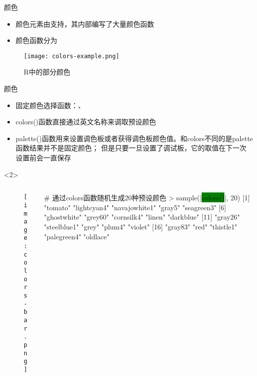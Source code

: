 \begin{frame}[t]{\subsecname}{颜色}
\begin{itemize}
\item<1-> 颜色元素由支持，其内部编写了大量颜色函数
\item<2-> 颜色函数分为
\end{itemize}

\begin{figure}
  \centering
  \texttt{[image: colors-example.png]}
  \caption{R中的部分颜色} 
\end{figure}  
\end{frame}

\begin{frame}[t,fragile]{\subsecname}{颜色}
\begin{itemize}
\item<1-> 固定颜色选择函数：、
\item<2-> colors()函数直接通过英文名称来调取预设颜色
\item<3-> palette()函数用来设置调色板或者获得调色板颜色值。和colors不同的是palette函数结果并不是固定颜色；
但是只要一旦设置了调试板，它的取值在下一次设置前会一直保存
\end{itemize}

\begin{overlayarea}{\textwidth}{\textheight}
\begin{onlyenv}<2>
  \begin{columns}
    \begin{column}{.4\textwidth}
\centering
      \begin{figure}
        \texttt{[image: colors-bar.png]} 
      \end{figure}
    \end{column}

    \begin{column}{.6\textwidth}
\centering
\begin{rcode}
# 通过colors函数随机生成20种预设颜色
> sample(|\colorbox{green}{colors()}|, 20)
 [1] "tomato"       "lightcyan4"   "navajowhite1" "gray5"        "seagreen3"   
 [6] "ghostwhite"   "grey60"       "cornsilk4"    "linen"        "darkblue"    
[11] "gray26"       "steelblue1"   "grey"         "plum4"        "violet"      
[16] "gray83"       "red"          "thistle1"     "palegreen4"   "oldlace" 
\end{rcode}
    \end{column}
  \end{columns}
\end{onlyenv}


\end{overlayarea}
\end{frame}
